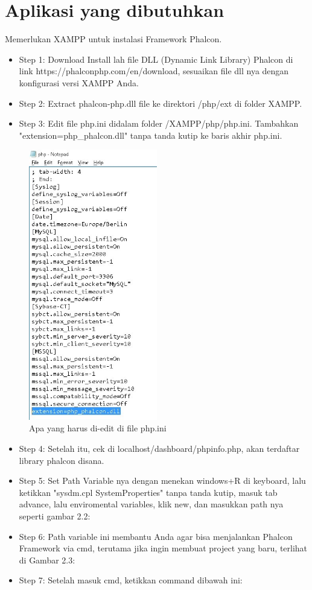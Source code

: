 \documentclass{wileySix}
\begin{document}
\section{Aplikasi yang dibutuhkan}
Memerlukan XAMPP untuk instalasi Framework Phalcon.
\begin{itemize}
 \item Step 1: Download Install lah file DLL (Dynamic Link Library) Phalcon di link https://phalconphp.com/en/download, sesuaikan file dll nya dengan konfigurasi versi XAMPP Anda.
 \item Step 2: Extract phalcon-php.dll file ke direktori /php/ext di folder XAMPP.
 \item Step 3: Edit file php.ini didalam folder /XAMPP/php/php.ini. Tambahkan "extension=php\_phalcon.dll" tanpa tanda kutip ke baris akhir php.ini.
\end{itemize}
\begin{figure}[ht]
\centerline{\includegraphics[width=0.5\textwidth]
{figures/extension.JPG}}
\caption{Apa yang harus di-edit di file php.ini}
\label{labelgambar}
\end{figure}
\begin{itemize}
 \item Step 4: Setelah itu, cek di localhost/dashboard/phpinfo.php, akan terdaftar library phalcon disana.
 \item Step 5: Set Path Variable nya dengan menekan windows+R di keyboard, lalu ketikkan "sysdm.cpl SystemProperties" tanpa tanda kutip, masuk tab advance, lalu enviromental variables, klik new, dan masukkan path nya seperti gambar 2.2:
 \item Step 6: Path variable ini membantu Anda agar bisa menjalankan Phalcon Framework via cmd, terutama jika ingin membuat project yang baru, terlihat di Gambar 2.3:
 \item Step 7: Setelah masuk cmd, ketikkan command dibawah ini:
 \end{itemize}
\end{document}
